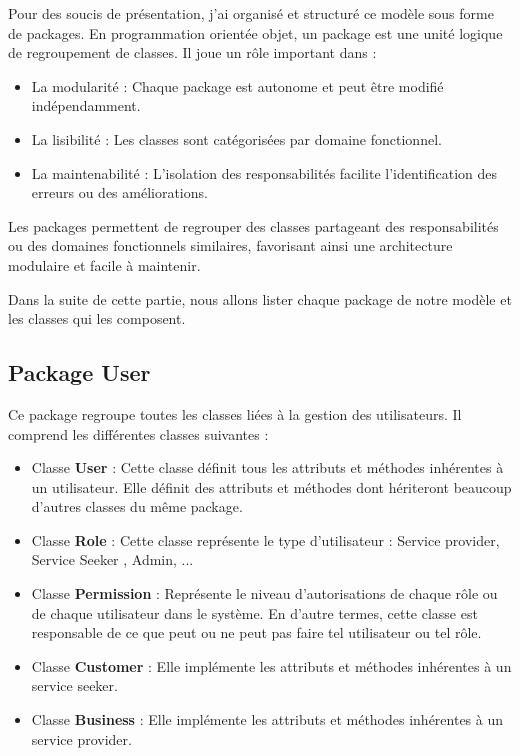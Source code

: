 {Pour des soucis de présentation, j'ai organisé et structuré ce modèle sous forme de packages. En programmation orientée objet, un package est une unité logique de regroupement de classes. Il joue un rôle important dans :

\vspace{0.4cm}
\begin{itemize}
    \item La modularité : Chaque package est autonome et peut être modifié indépendamment.
    \item La lisibilité : Les classes sont catégorisées par domaine fonctionnel.
    \item La maintenabilité : L'isolation des responsabilités facilite l'identification des erreurs ou des améliorations.
\end{itemize}

\vspace{0.4cm}
Les packages permettent de regrouper des classes partageant des responsabilités ou des domaines fonctionnels similaires, favorisant ainsi une architecture modulaire et facile à maintenir. 

\vspace{0.4cm}

Dans la suite de cette partie, nous allons lister chaque package de notre modèle et les classes qui les composent. 

\subsection{Package User}
Ce package regroupe toutes les classes liées à la gestion des utilisateurs.
Il comprend les différentes classes suivantes :

\vspace{0.35cm}

\begin{itemize} 
    \item Classe \textbf{User} : Cette classe définit tous les attributs et méthodes inhérentes à un utilisateur. Elle  définit des attributs et méthodes dont hériteront beaucoup d'autres classes du même package.
    \item Classe \textbf{Role} : Cette classe représente le type d'utilisateur : Service provider, Service Seeker , Admin, ...
    \item Classe \textbf{Permission} : Représente le niveau d'autorisations de chaque rôle ou de chaque utilisateur dans le système. En d'autre termes, cette classe est responsable de ce que peut ou ne peut pas faire tel utilisateur ou tel rôle.
    \item Classe \textbf{Customer} : Elle implémente les attributs et méthodes inhérentes à un service seeker.
    \item Classe \textbf{Business} : Elle implémente les attributs et méthodes inhérentes à un service provider.


\end{itemize}}

